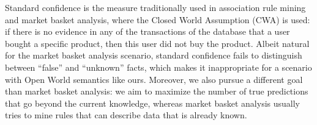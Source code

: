 Standard confidence is the measure traditionally used in association rule mining and market basket analysis, where the Closed World Assumption (CWA) is used:
if there is no evidence in any of the transactions of the database that a user bought a specific product, then this user did not buy the product.
Albeit natural for the market basket analysis scenario, standard confidence fails to distinguish between ``false'' and ``unknown'' facts,
which makes it inappropriate for a scenario with Open World semantics like ours. Moreover, we also pursue a different goal than market basket analysis:
we aim to maximize the number of true predictions that go beyond the current knowledge,
whereas market basket analysis usually tries to mine rules that can describe data that is already known.






